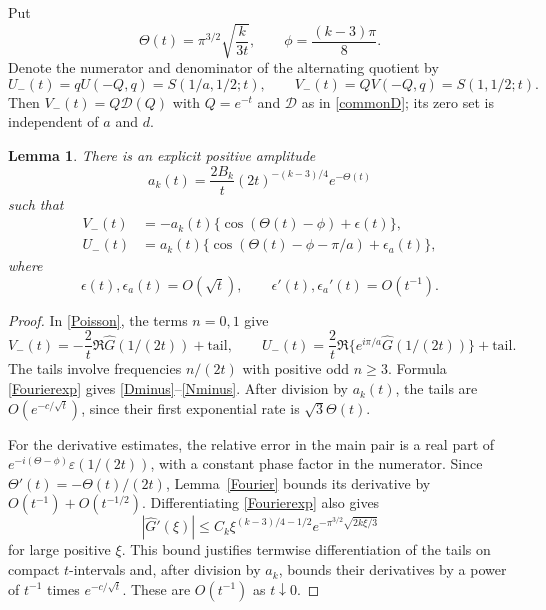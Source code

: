 \documentclass[11pt]{amsart}
\newtheorem{lemma}[theorem]{Lemma}
\theoremstyle{definition}
\theoremstyle{remark}
\numberwithin{equation}{section}
\begin{document}
Put
\begin{equation}\label{phase}
 \Theta(t)=\pi^{3/2}\sqrt{\frac{k}{3t}},\qquad
 \phi=\frac{(k-3)\pi}{8}.
\end{equation}
Denote the numerator and denominator of the alternating quotient by
\[
 U_-(t)=qU(-Q,q)=S(1/a,1/2;t),\qquad
 V_-(t)=QV(-Q,q)=S(1,1/2;t).
\]
Then $V_-(t)=Q\mathcal D(Q)$ with $Q=e^{-t}$ and $\mathcal D$ as in \eqref{commonD}; its zero set is independent of $a$ and $d$.

\begin{lemma}\label{alternating}
There is an explicit positive amplitude
\[
 a_k(t)=\frac{2B_k}{t}(2t)^{-(k-3)/4}e^{-\Theta(t)}
\]
such that
\begin{align}
 V_-(t)&=-a_k(t)\{\cos(\Theta(t)-\phi)+\epsilon(t)\},\label{Dminus}\\
 U_-(t)&= a_k(t)\{\cos(\Theta(t)-\phi-\pi/a)+\epsilon_a(t)\},\label{Nminus}
\end{align}
where
\begin{equation}\label{Eest}
 \epsilon(t),\epsilon_a(t)=O(\sqrt t),\qquad \epsilon'(t),\epsilon_a'(t)=O(t^{-1}).
\end{equation}
\end{lemma}
\begin{proof}
In \eqref{Poisson}, the terms $n=0,1$ give
\[
 V_-(t)=-\frac2t\Re\widehat G(1/(2t))+\text{tail},\qquad
 U_-(t)=\frac2t\Re\{e^{i\pi/a}\widehat G(1/(2t))\}+\text{tail}.
\]
The tails involve frequencies $n/(2t)$ with positive odd $n\ge3$. Formula \eqref{Fourierexp} gives \eqref{Dminus}--\eqref{Nminus}. After division by $a_k(t)$, the tails are $O(e^{-c/\sqrt t})$, since their first exponential rate is $\sqrt3\Theta(t)$.

For the derivative estimates, the relative error in the main pair is a real part of $e^{-i(\Theta-\phi)}\varepsilon(1/(2t))$, with a constant phase factor in the numerator. Since $\Theta'(t)=-\Theta(t)/(2t)$, Lemma~\ref{Fourier} bounds its derivative by $O(t^{-1})+O(t^{-1/2})$. Differentiating \eqref{Fourierexp} also gives
\[
 |\widehat G'(\xi)|\le C_k\xi^{(k-3)/4-1/2}
                  e^{-\pi^{3/2}\sqrt{2k\xi/3}}
\]
for large positive $\xi$. This bound justifies termwise differentiation of the tails on compact $t$-intervals and, after division by $a_k$, bounds their derivatives by a power of $t^{-1}$ times $e^{-c/\sqrt t}$. These are $O(t^{-1})$ as $t\downarrow0$.
\end{proof}
\end{document}

